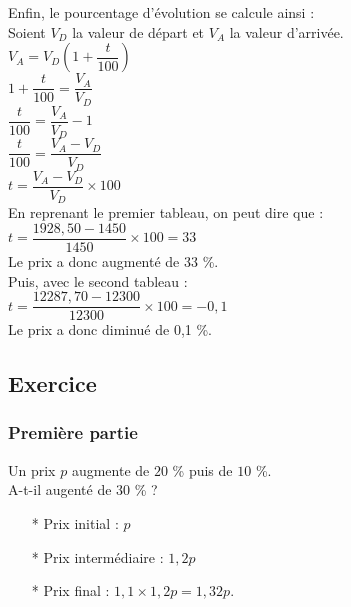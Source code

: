 Enfin, le pourcentage d'évolution se calcule ainsi : \\

Soient $V_D$ la valeur de départ et $V_A$ la valeur d'arrivée. \\

$V_A = V_D \left(1 + \dfrac{t}{100} \right) $ \\

$ 1 + \dfrac{t}{100} = \dfrac{V_A}{V_D} $ \\

$ \dfrac{t}{100} = \dfrac{V_A}{V_D} - 1 $ \\

$ \dfrac{t}{100} = \dfrac{V_A - V_D}{V_D} $ \\

$ t = \dfrac{V_A - V_D}{V_D} \times 100 $ \\

En reprenant le premier tableau, on peut dire que : \\

$ t = \dfrac{1928,50 - 1450}{1450} \times 100 = 33 $ \\

Le prix a donc augmenté de 33 \%. \\

Puis, avec le second tableau :  \\

$ t = \dfrac{12287,70 - 12300}{12300} \times 100 = -0,1 $ \\

Le prix a donc diminué de 0,1 \%.

\newpage

\subsection{Exercice }

\subsubsection*{Première partie}

Un prix $p$ augmente de $20$ \% puis de $10$ \%. \\

A-t-il augenté de $30$ \% ? \\

\begin{enumerate}
\item[*] Prix initial : $p$
\item[*] Prix intermédiaire : $1,2p$
\item[*] Prix final : $1,1 \times 1,2p = 1,32 p $. 
\end{enumerate} 

